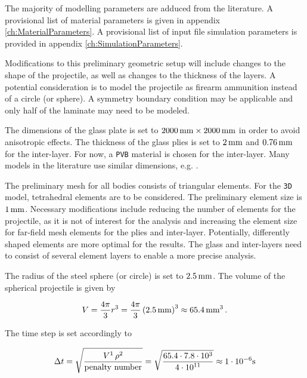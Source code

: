 \documentclass[12pt,twoside]{article}
\theoremstyle{break}
\begin{document}
\bigbreak
The majority of modelling parameters are adduced from the literature. A provisional list of material parameters is given in appendix \ref{ch:MaterialParameters}. A provisional list of input file simulation parameters is provided in appendix \ref{ch:SimulationParameters}.

\bigbreak
Modifications to this preliminary geometric setup will include changes to the shape of the projectile, as well as changes to the thickness of the layers. A potential consideration is to model the projectile as firearm ammunition instead of a circle (or sphere). A symmetry boundary condition may be applicable and only half of the laminate may need to be modeled.

\bigbreak
The dimensions of the glass plate is set to $2000\,{\rm{mm}}\times2000\,{\rm{mm}}$ in order to avoid anisotropic effects. The thickness of the glass plies is set to $2\,{\rm{mm}}$ and $0.76\,{\rm{mm}}$ for the inter-layer. For now, a \texttt{PVB} material is chosen for the inter-layer. Many models in the literature use similar dimensions, e.g. \cite{Mun04}.

\bigbreak
The preliminary mesh for all bodies consists of triangular elements. For the \texttt{3D} model, tetrahedral elements \cite{Che18} are to be considered. The preliminary element size is $1\,{\rm{mm}}$. Necessary modifications include reducing the number of elements for the projectile, as it is not of interest for the analysis and increasing the element size for far-field mesh elements for the plies and inter-layer. Potentially, differently shaped elements are more optimal for the results. The glass and inter-layers need to consist of several element layers to enable a more precise analysis. 

\bigbreak
The radius of the steel sphere (or circle) is set to $2.5\,{\rm{mm}}$. The volume of the spherical projectile is given by 

\begin{equation}
    V=\frac{4\pi}{3}r^3=\frac{4\pi}{3}\left(2.5\,{\rm{mm}}\right)^3\approx65.4\,{\rm{mm}}^3\,.
\end{equation}

The time step \cite{Far19} is set accordingly to

\begin{equation}
\Delta t=\sqrt{\frac{V\footnotemark\,\rho\footnotemark}{\rm{penalty\,\, number}}}=\sqrt{\frac{65.4\cdot7.8\cdot10^3}{4\cdot{10}^{11}}}\approx1\cdot{10}^{-6}{\rm{s}}
\end{equation}
\addtocounter{footnote}{-2}
\end{document}
